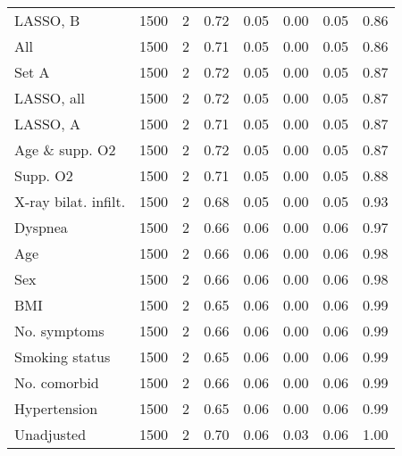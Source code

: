 \documentclass{article}
\begin{document}
\begin{table}[htbp]
{\begin{tabular}{lccccccc}
LASSO, B & 1500 & 2 & 0.72 & 0.05 & 0.00 & 0.05 & 0.86\\
All & 1500 & 2 & 0.71 & 0.05 & 0.00 & 0.05 & 0.86\\
Set A & 1500 & 2 & 0.72 & 0.05 & 0.00 & 0.05 & 0.87\\
LASSO, all & 1500 & 2 & 0.72 & 0.05 & 0.00 & 0.05 & 0.87\\
LASSO, A & 1500 & 2 & 0.71 & 0.05 & 0.00 & 0.05 & 0.87\\
Age \& supp. O2 & 1500 & 2 & 0.72 & 0.05 & 0.00 & 0.05 & 0.87\\
Supp. O2 & 1500 & 2 & 0.71 & 0.05 & 0.00 & 0.05 & 0.88\\
X-ray bilat. infilt. & 1500 & 2 & 0.68 & 0.05 & 0.00 & 0.05 & 0.93\\
Dyspnea & 1500 & 2 & 0.66 & 0.06 & 0.00 & 0.06 & 0.97\\
Age & 1500 & 2 & 0.66 & 0.06 & 0.00 & 0.06 & 0.98\\
Sex & 1500 & 2 & 0.66 & 0.06 & 0.00 & 0.06 & 0.98\\
BMI & 1500 & 2 & 0.65 & 0.06 & 0.00 & 0.06 & 0.99\\
No. symptoms & 1500 & 2 & 0.66 & 0.06 & 0.00 & 0.06 & 0.99\\
Smoking status & 1500 & 2 & 0.65 & 0.06 & 0.00 & 0.06 & 0.99\\
No. comorbid & 1500 & 2 & 0.66 & 0.06 & 0.00 & 0.06 & 0.99\\
Hypertension & 1500 & 2 & 0.65 & 0.06 & 0.00 & 0.06 & 0.99\\
Unadjusted & 1500 & 2 & 0.70 & 0.06 & 0.03 & 0.06 & 1.00\\
\bottomrule
\hline
\end{tabular}}
\end{table}
\end{document}
